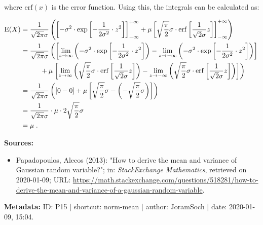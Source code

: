 \documentclass[a4paper,12pt,twoside]{book}
\begin{document}
where $\mathrm{erf}(x)$ is the error function. Using this, the integrals can be calculated as:

\begin{equation} \label{eq:norm-mean-norm-mean-s3}
\begin{split}
\mathrm{E}(X) &= \frac{1}{\sqrt{2 \pi} \sigma} \left( \left[ -\sigma^2 \cdot \exp \left[ -\frac{1}{2 \sigma^2} \cdot z^2 \right] \right]_{-\infty}^{+\infty} + \mu \left[ \sqrt{\frac{\pi}{2}} \sigma \cdot \mathrm{erf} \left[ \frac{1}{\sqrt{2} \sigma} z \right] \right]_{-\infty}^{+\infty} \right) \\
&= \frac{1}{\sqrt{2 \pi} \sigma} \left( \left[ \lim_{z \to \infty} \left( -\sigma^2 \cdot \exp \left[ -\frac{1}{2 \sigma^2} \cdot z^2 \right] \right) - \lim_{z \to -\infty} \left( -\sigma^2 \cdot \exp \left[ -\frac{1}{2 \sigma^2} \cdot z^2 \right] \right) \right] \right. \\
&\hphantom{\sqrt{2 \pi}\sigma \;} + \mu \left. \left[ \lim_{z \to \infty} \left( \sqrt{\frac{\pi}{2}} \sigma \cdot \mathrm{erf} \left[ \frac{1}{\sqrt{2} \sigma} z \right] \right) - \lim_{z \to -\infty} \left( \sqrt{\frac{\pi}{2}} \sigma \cdot \mathrm{erf} \left[ \frac{1}{\sqrt{2} \sigma} z \right] \right) \right] \right) \\
&= \frac{1}{\sqrt{2 \pi} \sigma} \left( [0 - 0] + \mu \left[ \sqrt{\frac{\pi}{2}} \sigma - \left(- \sqrt{\frac{\pi}{2}} \sigma \right) \right] \right) \\
&= \frac{1}{\sqrt{2 \pi} \sigma} \cdot \mu \cdot 2 \sqrt{\frac{\pi}{2}} \sigma \\
&= \mu \; .
\end{split}
\end{equation}



\vspace{1em}
\textbf{Sources:}
\begin{itemize}
\item Papadopoulos, Alecos (2013): "How to derive the mean and variance of Gaussian random variable?"; in: \textit{StackExchange Mathematics}, retrieved on 2020-01-09; URL: \url{https://math.stackexchange.com/questions/518281/how-to-derive-the-mean-and-variance-of-a-gaussian-random-variable}.
\end{itemize}


\vspace{1em}
\textbf{Metadata:} ID: P15 | shortcut: norm-mean | author: JoramSoch | date: 2020-01-09, 15:04.
\vspace{1em}
\end{document}
